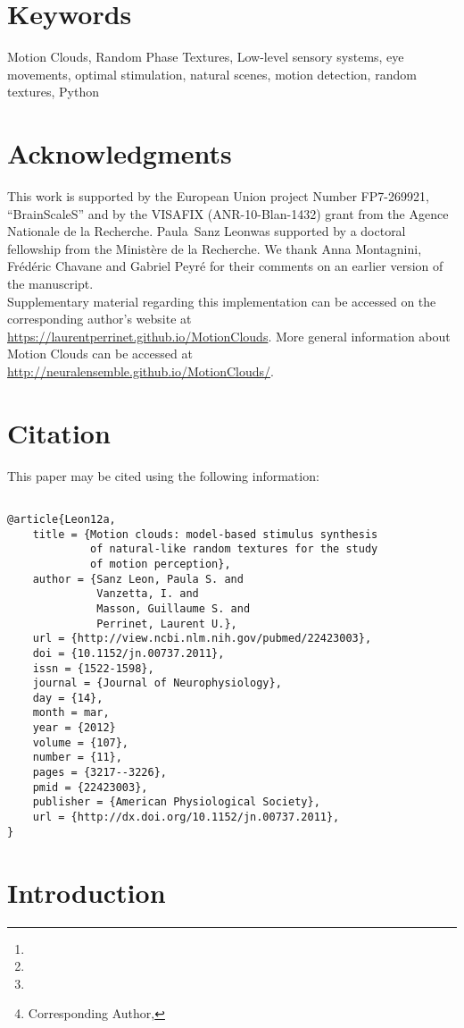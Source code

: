 \documentclass[a4paper,11pt]{article}%
\title{\Title}%
\author[1,2]{\AuthorA \thanks{\EmailA}}
\author[1,2]{\AuthorB \thanks{\EmailB}}
\author[1,2]{\AuthorC \thanks{\EmailC}}
\author[1,2]{\AuthorD \thanks{Corresponding Author, \EmailD}}%
\affil[1]{\AddressA}
\affil[2]{\AddressB}
\date{}%
\newcommand{\AuthorA}{Paula~Sanz Leon}%
\newcommand{\Website}{https://laurentperrinet.github.io}%
\newcommand{\Abstract}{%
Choosing an appropriate set of stimuli is essential in order to characterize the response of a sensory system to a particular functional dimension, such as the eye movement following the motion of a visual scene. %
Here, we describe a framework to generate random texture movies with controlled information content, i.e., Motion Clouds. These stimuli are defined using a generative model which is based on controlled experimental parametrization. %
We show that Motion Clouds correspond to dense mixing of localized moving gratings with random positions. Their global envelope is similar to natural-like stimulation with an approximate full-field translation corresponding to a retinal slip. %
We describe the construction of these stimuli mathematically and propose an open-source python-based implementation. %
Examples of the use of this framework are shown. We also propose extensions to other modalities such as color vision, touch and audition.%
}%
\newcommand{\Keywords}%
{Motion Clouds, Random Phase Textures, Low-level sensory systems, eye movements, optimal stimulation, natural scenes, motion detection, random textures, Python}
\newcommand{\Acknowledgments}{%
This work is supported by the European Union project Number FP7-269921, ``BrainScaleS'' and by the VISAFIX (ANR-10-Blan-1432)  grant from the Agence Nationale de la Recherche. \AuthorA was supported by a doctoral fellowship from the Minist{\`e}re de la Recherche. We thank Anna Montagnini, Fr\'ed\'eric Chavane and Gabriel Peyr\'e for their comments on an earlier version of the manuscript. \\ Supplementary material regarding this implementation can be accessed on the corresponding author's website at \url{\Website/MotionClouds}. More general information about Motion Clouds can be accessed at \url{http://neuralensemble.github.io/MotionClouds/}.  }%
\begin{document}
\maketitle
\begin{abstract}
\Abstract
\end{abstract}%
\section*{Keywords}
\Keywords
\section*{Acknowledgments}
\Acknowledgments
\section*{Citation}
This paper may be cited using the following information:
\begin{verbatim}

@article{Leon12a,
    title = {Motion clouds: model-based stimulus synthesis 
             of natural-like random textures for the study 
             of motion perception},
    author = {Sanz Leon, Paula S. and 
              Vanzetta, I. and 
              Masson, Guillaume S. and 
              Perrinet, Laurent U.},
    url = {http://view.ncbi.nlm.nih.gov/pubmed/22423003},
    doi = {10.1152/jn.00737.2011},
    issn = {1522-1598},
    journal = {Journal of Neurophysiology},
    day = {14},
    month = mar,
    year = {2012}
    volume = {107},
    number = {11},
    pages = {3217--3226},
    pmid = {22423003},
    publisher = {American Physiological Society},
    url = {http://dx.doi.org/10.1152/jn.00737.2011},
}

\end{verbatim}
\section{Introduction }\label{intro}
\end{document}

